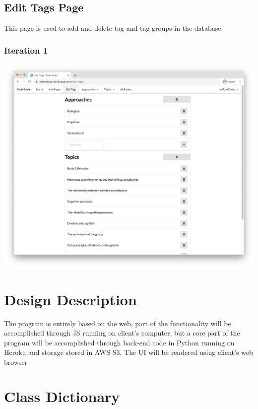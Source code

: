 \documentclass[
]{article}
\begin{document}
\hypertarget{edit-tags-page}{%
\subsection{Edit Tags Page}\label{edit-tags-page}}

This page is used to add and delete tag and tag groups in the database.

\hypertarget{iteration-1-3}{%
\subsubsection{Iteration 1}\label{iteration-1-3}}

\includegraphics{img/edit tags page iteration 1.png}\\

\hypertarget{design-description}{%
\section{Design Description}\label{design-description}}

The program is entirely based on the web, part of the functionality will
be accomplished through JS running on client's computer, but a core part
of the program will be accomplished through back-end code in Python
running on Heroku and storage stored in AWS S3. The UI will be rendered
using client's web browser

\hypertarget{class-dictionary}{%
\section{Class Dictionary}\label{class-dictionary}}
\end{document}
